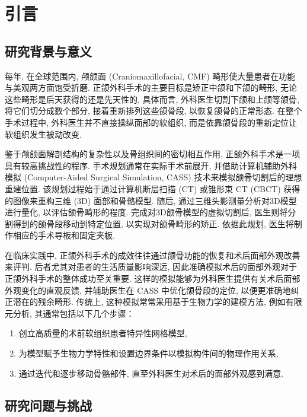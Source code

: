 
\chapter{引言}

\section{研究背景与意义}

每年, 在全球范围内, 颅颌面 (Craniomaxillofacial, CMF) 畸形使大量患者在功能与美观两方面饱受折磨.
正颌外科手术的主要目标是矫正中颌和下颌的畸形, 无论这些畸形是后天获得的还是先天性的.
具体而言, 外科医生切割下颌和上颌等颌骨, 将它们切分成数个部分, 接着重新排列这些颌骨段, 以恢复颌骨的正常形态.
在整个手术过程中, 外科医生并不直接操纵面部的软组织, 而是依靠颌骨段的重新定位让软组织发生被动改变.

鉴于颅颌面解剖结构的复杂性以及骨组织间的密切相互作用, 正颌外科手术是一项具有较高挑战性的程序.
手术规划通常在实际手术前展开, 并借助计算机辅助外科模拟 (Computer-Aided Surgical Simulation, CASS) 技术来模拟颌骨切割后的理想重建位置.
该规划过程始于通过计算机断层扫描 (CT) 或锥形束 CT (CBCT) 获得的图像来重构三维 (3D) 面部和骨骼模型.
随后, 通过三维头影测量分析对3D模型进行量化, 以评估颌骨畸形的程度.
完成对3D颌骨模型的虚拟切割后, 医生则将分割得到的颌骨段移动到特定位置, 以实现对颌骨畸形的矫正.
依据此规划, 医生将制作相应的手术导板和固定夹板.

在临床实践中, 正颌外科手术的成效往往通过颌骨功能的恢复和术后面部外观改善来评判.
后者尤其对患者的生活质量影响深远, 因此准确模拟术后的面部外观对于正颌外科手术的整体成功至关重要.
这样的模拟能够为外科医生提供有关术后面部外观变化的直观反馈, 并辅助医生在 CASS 中优化颌骨段的定位, 以便更准确地纠正潜在的残余畸形.
传统上, 这种模拟常常采用基于生物力学的建模方法, 例如有限元分析, 其通常包括以下几个步骤：

\begin{enumerate}
  \item 创立高质量的术前软组织患者特异性网格模型,
  \item 为模型赋予生物力学特性和设置边界条件以模拟构件间的物理作用关系,
  \item 通过迭代和逐步移动骨骼部件, 直至外科医生对术后的面部外观感到满意.

\end{enumerate}

\section{研究问题与挑战}

